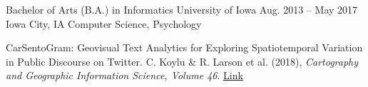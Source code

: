 \begin{cventries}
  \education
    {Bachelor of Arts (B.A.) in Informatics}
    {University of Iowa}
		{Aug. 2013 -- May 2017}
    {Iowa City, IA}
		{Computer Science, Psychology}
		{}
\end{cventries}
{}
\begin{cvhonors}
	\cvhonor
		{%
			CarSentoGram: Geovisual Text Analytics for Exploring Spatiotemporal Variation in Public Discourse on Twitter. C. Koylu \& R. Larson et al. (2018), \textit{Cartography and Geographic Information Science, Volume 46}.
		}
		{\href{https://www.tandfonline.com/doi/full/10.1080/15230406.2018.1510343}{Link}}
\end{cvhonors}